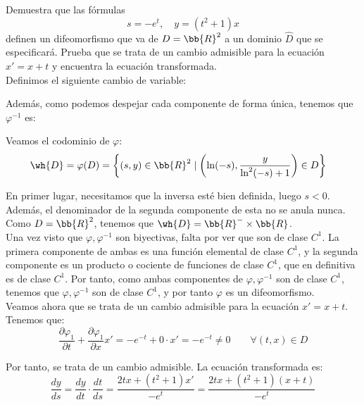 \documentclass[12pt]{article}
\begin{document}
\begin{ejercicio}
    Demuestra que las fórmulas
    \begin{equation*}
        s = -e^t, \quad y = (t^2 + 1)x
    \end{equation*}
    definen un difeomorfismo que va de $D = \bb{R}^2$ a un dominio $\hat{D}$ que se especificará.
    Prueba que se trata de un cambio admisible para la ecuación $x' = x + t$ y encuentra la ecuación transformada.\\

    Definimos el siguiente cambio de variable:

    Además, como podemos despejar cada componente de forma única, tenemos que $\varphi^{-1}$ es:

    Veamos el codominio de $\varphi$:
    \begin{align*}
        \wh{D}=\varphi(D) &= \left\{(s, y)\in\bb{R}^2 \mid \left(\ln(-s), \dfrac{y}{\ln^2(-s)+1}\right)\in D\right\}
    \end{align*}

    En primer lugar, necesitamos que la inversa esté bien definida, luego $s<0$. Además, el denominador de la segunda componente de esta no se anula nunca. Como $D=\bb{R}^2$, tenemos que $\wh{D}=\bb{R}^- \times \bb{R}$.\\

    Una vez visto que $\varphi,\varphi^{-1}$ son biyectivas, falta por ver que son de clase $C^1$. La primera componente de ambas es una función elemental de clase $C^1$, y la segunda componente es un producto o cociente de funciones de clase $C^1$, que en definitiva es de clase $C^1$.
    Por tanto, como ambas componentes de $\varphi, \varphi^{-1}$ son de clase $C^1$, tenemos que $\varphi, \varphi^{-1}$ son de clase $C^1$, y por tanto $\varphi$ es un difeomorfismo.\\

    Veamos ahora que se trata de un cambio admisible para la ecuación $x' = x + t$. Tenemos que:
    \begin{equation*}
        \dfrac{\partial \varphi_1}{\partial t} + \dfrac{\partial \varphi_1}{\partial x} x'=-e^{-t}+0\cdot x'=-e^{-t}\neq 0 \qquad \forall (t,x)\in D
    \end{equation*}

    Por tanto, se trata de un cambio admisible. La ecuación transformada es:
    \begin{equation*}
        \dfrac{dy}{ds} = \dfrac{dy}{dt}\cdot \dfrac{dt}{ds} = \dfrac{2tx+(t^2+1)x'}{-e^t} = \dfrac{2tx+(t^2+1)(x+t)}{-e^t}
    \end{equation*}


\end{ejercicio}
\end{document}
